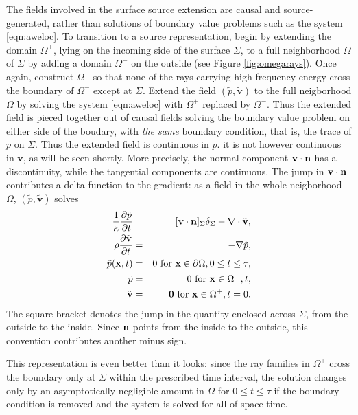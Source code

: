 \documentclass[12pt]{geophysics}
\newcommand{\bx}{\mathbf{x}}
\newcommand{\bv}{\mathbf{v}}
\begin{document}
The fields involved in the surface source extension are causal and
source-generated, rather than solutions of boundary value problems
such as the system \ref{eqn:aweloc}. To transition to a source
representation, begin by extending the domain $\Omega^+$, lying on the
incoming side of the surface $\Sigma$, to a full neighborhood $\Omega$
of $\Sigma$
by adding a domain $\Omega^-$ on the outside (see Figure
\ref{fig:omegarays}). Once again, construct $\Omega^-$ so that none of
the rays carrying high-frequency energy cross the boundary of
$\Omega^-$ except at $\Sigma$. Extend the field $(\tilde{p},\tilde{\bv})$ to the
full neigborhood $\Omega$ by solving the system \ref{eqn:aweloc} with
$\Omega^+$ replaced by $\Omega^-$. Thus the extended
field is pieced together out of causal fields solving the boundary value
problem on either side of the boudary, with {\em the same} boundary
condition, that is, the trace of $p$ on $\Sigma$. Thus the extended
field is continuous in $p$. it is not however continuous in
$\bv$, as will be seen shortly. More precisely, the normal component
$\bv\cdot {\bf n}$
has a discontinuity, while the tangential components are continuous.
The jump in
$\bv\cdot {\bf n}$ contributes a delta function to the gradient: as a
field in the whole neigborhood $\Omega$, $(\tilde{p},\tilde{\bv})$
solves
\begin{eqnarray}
\label{eqn:awebase}
  \frac{1}{\kappa}\frac{\partial \tilde{p}}{\partial t} & = & [\bv \cdot {\bf n}]_{\Sigma}\delta_{\Sigma}
                                                      - \nabla \cdot \tilde{\bv}, \nonumber \\
  \rho\frac{\partial \tilde{\bv}}{\partial t} & = & - \nabla \tilde{p}, \nonumber \\
  \tilde{p}(\bx,t) & = & 0 \mbox{ for } \bx \in \partial \Omega, 0 \le t \le 
  \tau, \nonumber \\
  \tilde{p} & = & 0 \mbox{ for } \bx \in \Omega^+, t , \nonumber \\
  \tilde{\bv} & = & {\bf 0} \mbox{ for } \bx \in \Omega^+, t = 0.       
\end{eqnarray}
The square bracket denotes the jump in the quantity enclosed across
$\Sigma$, from the outside to the inside. Since ${\bf n}$ points from
the inside to the outside, this convention contributes another minus
sign.

This representation is even better than it looks: since the ray
families in $\Omega^{\pm}$ cross the boundary only at $\Sigma$ within
the prescribed time interval, the
solution changes only by an asymptotically negligible amount in
$\Omega$ for $0 \le t \le \tau$ if the boundary condition is removed
and the system is solved for all of space-time.
\end{document}
